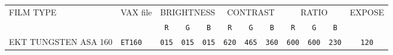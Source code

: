\begin{table}[htb]
\begin{center}
\begin{tabular}{|l|l|c|c|c|c|c|c|c|c|c|c|} 
\hline
{FILM TYPE} & {VAX file} & 
\multicolumn{3}{|c|}{{BRIGHTNESS}} & 
\multicolumn{3}{|c|}{{CONTRAST}} & 
\multicolumn{3}{|c|}{{RATIO}} & {EXPOSE} \\
\cline {3-11} 
& & {\tt R} & {\tt G} & {\tt B} & {\tt R} & {\tt G} & 
{\tt B}& {\tt R} &  {\tt G} & {\tt B} & \\ 
\hline

% 
% 
% 
% 
% 
% 
% 
% 
{EKT \scriptsize TUNGSTEN ASA 160} & {\tt ET160} & {\tt 015} & {\tt 015} &
{\tt 015} & {\tt 620} & {\tt 465} & {\tt 360} & {\tt 600} & {\tt 600} & 
{\tt 230} & {\tt 120} \\


\end{tabular}
\end{center}
\end{table}
